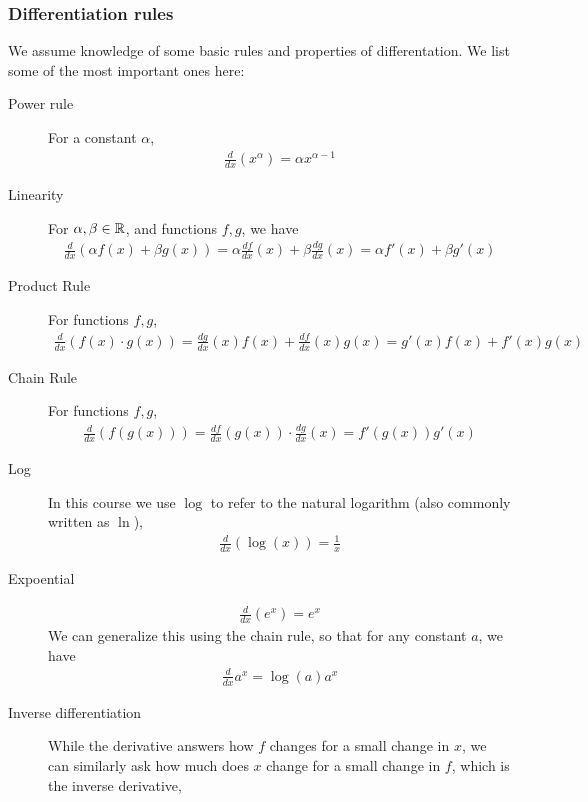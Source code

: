 \subsubsection*{Differentiation rules}
We assume knowledge of some basic rules and properties of differentation. We list some of the most important ones here:
\begin{description}
    \item[Power rule] For a constant $\alpha$, 
    \begin{align*}
        \frac{d}{dx}(x^\alpha) = \alpha x^{\alpha - 1}
    \end{align*}
    \item[Linearity] For $\alpha, \beta \in \mathbb{R}$, and functions $f, g$, we have
    \begin{align*}
        \frac{d}{dx} (\alpha f(x) + \beta g(x)) = \alpha \frac{df}{dx}(x) + \beta \frac{dg}{dx}(x) = \alpha f'(x) + \beta g'(x)
    \end{align*} 
    \item[Product Rule] For functions $f, g$,
    \begin{align*}
        \frac{d}{dx} (f(x) \cdot g(x)) = \frac{dg}{dx}(x)f(x) + \frac{df}{dx}(x) g(x) = g'(x) f(x) + f'(x) g(x)
    \end{align*}
    \item[Chain Rule] For functions $f, g$, 
    \begin{align*}
        \frac{d}{dx}(f(g(x))) = \frac{df}{dx}(g(x))  \cdot \frac{dg}{dx}(x) = f'(g(x)) g'(x)
    \end{align*}
    \item[Log] In this course we use $\log$ to refer to the natural logarithm (also commonly written as $\ln$),
    \begin{align*}
        \frac{d}{dx}(\log(x)) = \frac{1}{x}
    \end{align*}  
    \item[Expoential]
    \begin{align*}
        \frac{d}{dx}(e^x) = e^x
    \end{align*}
    We can generalize this using the chain rule, so that for any constant $a$, we have
    \begin{align*}
        \frac{d}{dx} a^{x} = \log(a) a^x
    \end{align*}
    \item[Inverse differentiation] While the derivative answers how $f$ changes for a small change in $x$, we can similarly ask how much does $x$ change for a small change in $f$, which is the inverse derivative,

\end{description}

